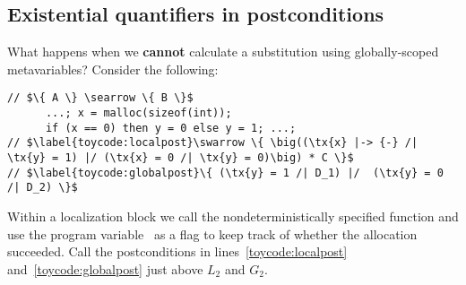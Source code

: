 {%
\iffalse
This strategy is sufficient to handle all of the localization blocks in Figure~\ref{fig:markgraph}.  For example, in lines~\ref{code:markbeforetripleramify}--\ref{code:markaftertripleramify}, choose $F \defeq \null$
\vspace*{-0.75ex}
\[
\begin{array}{@{}l@{}}
\big(\li{x} |-> 1,-,l,r /| \gamma(\li{x}) = (0,l,r) /| \exists \gamma'.~ \m{mark1}(\gamma, \li{x}, \gamma')\big) \\ \null --* \big(\exists \gamma'.~ \p{graph}(\li{x},\gamma') /| \gamma(\li{x}) = (0,l,r) /| \m{mark1}(\gamma, \li{x}, \gamma') \big)
\end{array}
\vspace*{-0.75ex}
\]
Note the use of the metavariables $l$ and $r$ rather than \li{l} and \li{r} in $F$, added to the metacontext in lines~\ref{code:globalbeforerootmarkwithex}--\ref{code:globalbeforerootmark} using Floyd's \infrulestyle{Existential extraction} rule~\cite{floydlogic}:
\vspace*{-0.75ex}
\[
\infrule{Existential extraction}
{\forall x.~ \big(\{ P \} ~ c ~ \{Q \}\big)}
{\{ \exists x. P \} ~ c ~ \{ \exists x.~ Q \}}{}
\vspace*{-0.75ex}
\]
Pen and paper Hoare proofs are often a little casual with existentials, \emph{e.g.} omitting line~\ref{code:globalbeforerootmarkwithex}; we wrote it because we wanted to be clear that the metavariables $l$ and $r$ were properly ``in scope'' over the localization blocks.
\fi


\subsection{Existential quantifiers in postconditions}
\label{sec:existentials}

What happens when we \textbf{cannot} calculate a substitution using globally-scoped metavariables?  Consider the following: %
\begin{lstlisting}
// $\{ A \} \searrow \{ B \}$
      ...; x = malloc(sizeof(int));
      if (x == 0) then y = 0 else y = 1; ...;
// $\label{toycode:localpost}\swarrow \{ \big((\tx{x} |-> {-} /| \tx{y} = 1) |/ (\tx{x} = 0 /| \tx{y} = 0)\big) * C \}$
// $\label{toycode:globalpost}\{ (\tx{y} = 1 /| D_1) |/  (\tx{y} = 0 /| D_2) \}$
\end{lstlisting}
\vspace*{-1.5ex}
Within a localization block we call the nondeterministically specified function  and use the program variable~ as a flag to keep track of whether the allocation succeeded.  Call the postconditions in lines~\ref{toycode:localpost} and~\ref{toycode:globalpost} just above $L_2$ and $G_2$. %

}
